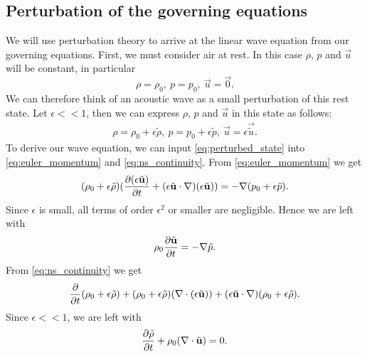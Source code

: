 \subsection{Perturbation of the governing equations}\label{ss:perturbation}
We will use perturbation theory to arrive at the linear wave equation from our governing equations.
%
First, we must consider air at rest. In this case $\rho$, $p$ and $\vec{u}$ will be constant, in particular
    \[ \rho = \rho_0,~ p = p_0,~ \vec{u} = \vec{0}.
    \]
%
We can therefore think of an acoustic wave as a small perturbation of this rest state. Let $\epsilon << 1$, then we can express $\rho$, $p$ and $\vec{u}$ in this state as follows:
    \begin{gather}\label{eq:perturbed_state}
    \rho = \rho_0 +\epsilon \tilde{\rho},~ 
    p = p_0 + \epsilon \tilde{p},~ 
    \vec{u} = \epsilon \vec{\tilde{u}}.
    \end{gather}
% 
To derive our wave equation, we can input \eqref{eq:perturbed_state} into \eqref{eq:euler_momentum} and \eqref{eq:ns_continuity}.
%
From \eqref{eq:euler_momentum} we get
    \begin{equation*}
        (\rho_0 + \epsilon\tilde{\rho})
        (
        \frac{\partial (\epsilon \tilde{\mathbf{u}})}{\partial t} + (\epsilon\tilde{\mathbf{u}} \cdot \nabla)(\epsilon\tilde{\mathbf{u}})
        )
        = - \nabla (p_0 + \epsilon\tilde{p}).
    \end{equation*}
%   
Since $\epsilon$ is small, all terms of order $\epsilon^2$ or smaller are negligible. Hence we are left with
    \begin{equation}\label{eq:perturbed_momentum}
        \rho_0 \frac{\partial \tilde{\mathbf{u}}}{\partial t} = - \nabla \tilde{p}.
    \end{equation}
%
From \eqref{eq:ns_continuity} we get
    \begin{equation*}
        \frac{\partial }{\partial t}(\rho_0 + \epsilon\tilde{\rho}) + (\rho_0 + \epsilon\tilde{\rho})(\nabla \cdot (\epsilon\tilde{\mathbf{u}})) + (\epsilon\tilde{\mathbf{u}} \cdot \nabla) (\rho_0 + \epsilon\tilde{\rho}).
    \end{equation*}
%   
Since $\epsilon<<1$, we are left with
    \begin{equation}\label{eq:perturbed_continuity}
        \frac{\partial \tilde{\rho}}{\partial t} + \rho_0 (\nabla \cdot \tilde{\mathbf{u}}) = 0. 
    \end{equation}
%
